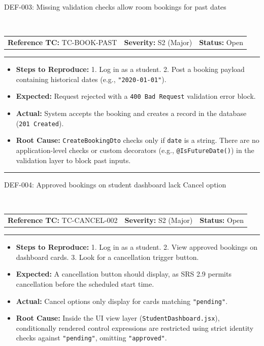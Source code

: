\documentclass[11pt,a4paper]{article}
\makeatletter
\newcommand{\defectheader}[5]{%
    \needspace{6\baselineskip}
    \noindent\colorbox{primaryblue}{\parbox{\dimexpr\textwidth-2\fboxsep\relax}{
        \color{white}\bfseries\large\strut #1: #2
    }}
    \nopagebreak\\
    \noindent\begin{tabularx}{\textwidth}{@{}X X X@{}}
        \textbf{Reference TC:} #3 & \textbf{Severity:} #4 & \textbf{Status:} #5 \\
    \end{tabularx}
    \nopagebreak\vspace{0.1cm}
    \nopagebreak\hrule\vspace{0.2cm}
}
\makeatother
\begin{document}
\newpage

\defectheader{DEF-003}{Missing validation checks allow room bookings for past dates}{TC-BOOK-PAST}{S2 (Major)}{Open}
\begin{itemize}[noitemsep,topsep=1pt,leftmargin=0.5cm]
    \item \textbf{Steps to Reproduce:} 
    1. Log in as a student. 2. Post a booking payload containing historical dates (e.g., \texttt{"2020-01-01"}).
    \item \textbf{Expected:} Request rejected with a \texttt{400 Bad Request} validation error block.
    \item \textbf{Actual:} System accepts the booking and creates a record in the database (\texttt{201 Created}).
    \item \textbf{Root Cause:} \texttt{CreateBookingDto} checks only if \texttt{date} is a string. There are no application-level checks or custom decorators (e.g., \texttt{@IsFutureDate()}) in the validation layer to block past inputs.
\end{itemize}

\vspace{0.4cm}\hrule\vspace{0.4cm}

\defectheader{DEF-004}{Approved bookings on student dashboard lack Cancel option}{TC-CANCEL-002}{S2 (Major)}{Open}
\begin{itemize}[noitemsep,topsep=1pt,leftmargin=0.5cm]
    \item \textbf{Steps to Reproduce:} 
    1. Log in as a student. 2. View approved bookings on dashboard cards. 3. Look for a cancellation trigger button.
    \item \textbf{Expected:} A cancellation button should display, as SRS 2.9 permits cancellation before the scheduled start time.
    \item \textbf{Actual:} Cancel options only display for cards matching \texttt{"pending"}.
    \item \textbf{Root Cause:} Inside the UI view layer (\texttt{StudentDashboard.jsx}), conditionally rendered control expressions are restricted using strict identity checks against \texttt{"pending"}, omitting \texttt{"approved"}.
\end{itemize}

\newpage
\end{document}
